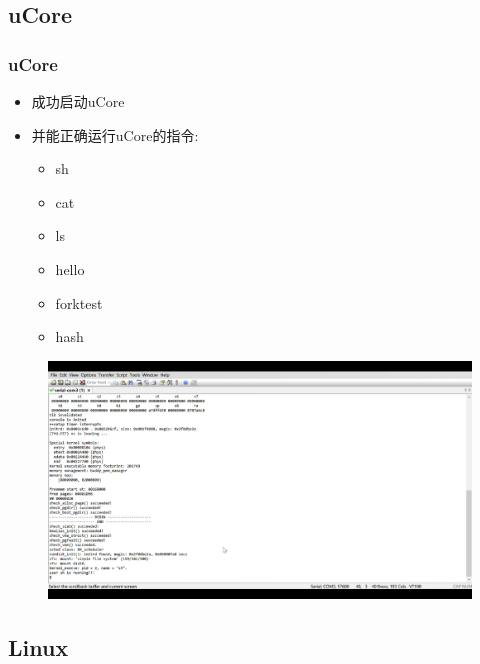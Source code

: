 \documentclass{beamer}
\begin{document}
\subsection{uCore}

\begin{frame}
    \frametitle{uCore}

    \begin{minipage}[c]{0.4\linewidth}
        \begin{itemize}
        \item 成功启动uCore
        \item 并能正确运行uCore的指令:\begin{itemize}
            \item sh
            \item cat
            \item ls
            \item hello
            \item forktest
            \item hash
        \end{itemize}
    \end{itemize}
    \end{minipage}
    \hfill
    \begin{minipage}{0.5\linewidth}
        \begin{figure}
            \centering
            \includegraphics[width=1.1\textwidth]{pic/Ucore.pdf}
        \end{figure}
    \end{minipage}

\end{frame}

\subsection{Linux}
\end{document}
